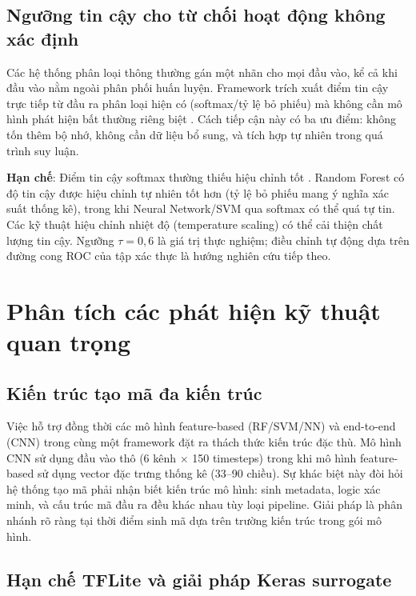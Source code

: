 \subsection{Ngưỡng tin cậy cho từ chối hoạt động không xác định}
\label{sec:confidence_discussion}

Các hệ thống phân loại thông thường gán một nhãn cho mọi đầu vào, kể cả khi đầu vào nằm ngoài phân phối huấn luyện. Framework trích xuất điểm tin cậy trực tiếp từ đầu ra phân loại hiện có (softmax/tỷ lệ bỏ phiếu) mà không cần mô hình phát hiện bất thường riêng biệt \cite{hendrycks2017baseline}. Cách tiếp cận này có ba ưu điểm: không tốn thêm bộ nhớ, không cần dữ liệu bổ sung, và tích hợp tự nhiên trong quá trình suy luận.

\textbf{Hạn chế}: Điểm tin cậy softmax thường thiếu hiệu chỉnh tốt \cite{guo2017calibration}. Random Forest có độ tin cậy được hiệu chỉnh tự nhiên tốt hơn (tỷ lệ bỏ phiếu mang ý nghĩa xác suất thống kê), trong khi Neural Network/SVM qua softmax có thể quá tự tin. Các kỹ thuật hiệu chỉnh nhiệt độ (temperature scaling) có thể cải thiện chất lượng tin cậy. Ngưỡng $\tau = 0{,}6$ là giá trị thực nghiệm; điều chỉnh tự động dựa trên đường cong ROC của tập xác thực là hướng nghiên cứu tiếp theo.

\section{Phân tích các phát hiện kỹ thuật quan trọng}

\subsection{Kiến trúc tạo mã đa kiến trúc}
\label{sec:disc_multi_arch}

Việc hỗ trợ đồng thời các mô hình feature-based (RF/SVM/NN) và end-to-end (CNN) trong cùng một framework đặt ra thách thức kiến trúc đặc thù. Mô hình CNN sử dụng đầu vào thô (6 kênh × 150 timesteps) trong khi mô hình feature-based sử dụng vector đặc trưng thống kê (33--90 chiều). Sự khác biệt này đòi hỏi hệ thống tạo mã phải nhận biết kiến trúc mô hình: sinh metadata, logic xác minh, và cấu trúc mã đầu ra đều khác nhau tùy loại pipeline. Giải pháp là phân nhánh rõ ràng tại thời điểm sinh mã dựa trên trường kiến trúc trong gói mô hình.

\subsection{Hạn chế TFLite và giải pháp Keras surrogate}
\label{sec:disc_tflite_limitations}

